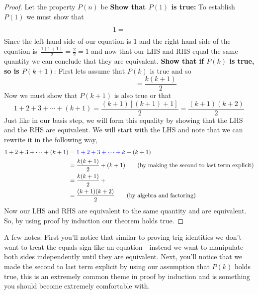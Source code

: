\documentclass[addpoints]{exam}
\begin{document}
	\begin{proof}
		Let the property $P(n)$ be
		\vspace{0.5in}
		\newline\textbf{Show that $P(1)$ is true:} To establish $P(1)$ we must show that
		\[
			1 = \phantom{\frac{1(2)}{2}}
		\]
		Since the left hand side of our equation is $1$ and the right hand side of the equation is $\displaystyle\,\frac{1(1+1)}{2}=\frac{2}{2} = 1$ and now that our LHS and RHS equal the same quantity we can conclude that they are equivalent.
		\newline\textbf{Show that if $P(k)$ is true, so is $P(k+1)$}: First lets assume that $P(k)$ is true and so
		\[
			\phantom{1 + 2 + 3 + \cdots + k} = \frac{k(k+1)}{2}
		\]
		Now we must show that $P(k+1)$ is also true or that
		\[
			1 + 2 + 3 + \cdots + (k+1) = \frac{\left(k+1\right)\left[\left(k+1\right)+1\right]}{2} = \frac{\left(k+1\right)\left(k+2\right)}{2}
		\]
		Just like in our basis step, we will form this equality by showing that the LHS and the RHS are equivalent. We will start with the LHS and note that we can rewrite it in the following way,
		\begin{align*}
			1 + 2 + 3 + \cdots + (k+1) & = \textcolor{blue}{1 + 2 + 3 + \cdots + k} + (k + 1)                        \\
			                           & = \frac{k(k+1)}{2} + (k+1) \tag{by making the second to last term explicit} \\
			                           & = \frac{k(k+1)}{2} + \phantom{\frac{2(k+1)}{2}}                             \\
			                           & = \frac{(k+1)(k+2)}{2} \tag{by algebra and factoring}
		\end{align*}
		Now our LHS and RHS are equivalent to the same quantity and are equivalent. So, by using proof by induction our theorem holds true.
	\end{proof}
\fi
\noindent\makebox[\linewidth]{\hrulefill}
\vspace{0.1in}
\newline A few notes: First you'll notice that similar to proving trig identities we don't want to treat the equals sign like an equation - instead we want to manipulate both sides independently until they are equivalent. Next, you'll notice that we made the second to last term explicit by using our assumption that $P(k)$ holds true, this is an extremely common theme in proof by induction and is something you should become extremely comfortable with.
\noindent\makebox[\linewidth]{\hrulefill}
\end{document}
